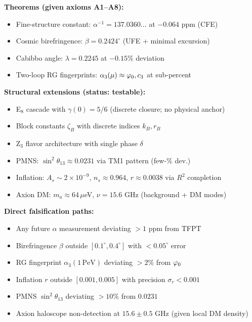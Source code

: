 \vspace{1em}
\begin{tcolorbox}[colback=gray!5, colframe=gray!60, title={\textbf{Claim Map: What This Paper Establishes}}, fonttitle=\bfseries]
\textbf{Theorems (given axioms A1--A8):}
\begin{itemize}[leftmargin=1.5em, topsep=2pt, itemsep=1pt]
    \item Fine-structure constant: $\alpha^{-1} = 137.0360\ldots$ at $-0.064$ ppm (CFE)
    \item Cosmic birefringence: $\beta = 0.2424^\circ$ (UFE + minimal excursion)
    \item Cabibbo angle: $\lambda = 0.2245$ at $-0.15\%$ deviation
    \item Two-loop RG fingerprints: $\alpha_3(\mu) \approx \varphi_0, c_3$ at sub-percent
\end{itemize}

\textbf{Structural extensions (status: testable):}
\begin{itemize}[leftmargin=1.5em, topsep=2pt, itemsep=1pt]
    \item E$_8$ cascade with $\gamma(0)=5/6$ (discrete closure; no physical anchor)
    \item Block constants $\zeta_B$ with discrete indices $k_B, r_B$
    \item Z$_3$ flavor architecture with single phase $\delta$
    \item PMNS: $\sin^2\theta_{13} \approx 0.0231$ via TM1 pattern (few-\% dev.)
    \item Inflation: $A_s \sim 2\times10^{-9}$, $n_s \approx 0.964$, $r \approx 0.0038$ via $R^2$ completion
    \item Axion DM: $m_a \approx 64\,\mu$eV, $\nu = 15.6$ GHz (background + DM modes)
\end{itemize}

\textbf{Direct falsification paths:}
\begin{itemize}[leftmargin=1.5em, topsep=2pt, itemsep=1pt]
    \item Any future $\alpha$ measurement deviating $>1$ ppm from TFPT
    \item Birefringence $\beta$ outside $[0.1^\circ, 0.4^\circ]$ with $<0.05^\circ$ error
    \item RG fingerprint $\alpha_3(1\,\mathrm{PeV})$ deviating $>2\%$ from $\varphi_0$
    \item Inflation $r$ outside $[0.001, 0.005]$ with precision $\sigma_r < 0.001$
    \item PMNS $\sin^2\theta_{13}$ deviating $>10\%$ from $0.0231$
    \item Axion haloscope non-detection at $15.6 \pm 0.5$ GHz (given local DM density)
\end{itemize}
\end{tcolorbox}

